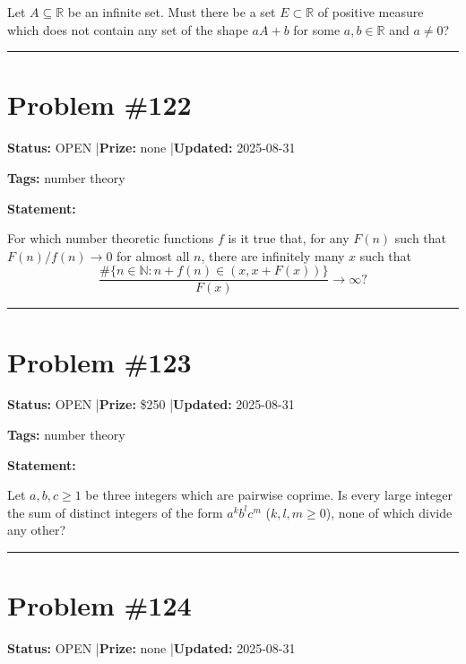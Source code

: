 \documentclass{article}
\begin{document}
Let $A\subseteq\mathbb{R}$ be an infinite set. Must there be a set $E\subset \mathbb{R}$ of positive measure which does not contain any set of the shape $aA+b$ for some $a,b\in\mathbb{R}$ and $a\neq 0$?

\noindent\rule{\linewidth}{0.4pt}


\section{Problem \#122}
\label{prob:122}

\noindent\textbf{Status:} OPEN \quad|\quad \textbf{Prize:} none \quad|\quad \textbf{Updated:} 2025-08-31

\noindent\textbf{Tags:} number theory

\medskip

\noindent\textbf{Statement:}

For which number theoretic functions $f$ is it true that, for any $F(n)$ such that $F(n)/f(n)\to 0$ for almost all $n$, there are infinitely many $x$ such that\[\frac{\#\{ n\in \mathbb{N} : n+f(n)\in (x,x+F(x))\}}{F(x)}\to \infty?\]

\noindent\rule{\linewidth}{0.4pt}


\section{Problem \#123}
\label{prob:123}

\noindent\textbf{Status:} OPEN \quad|\quad \textbf{Prize:} \$250 \quad|\quad \textbf{Updated:} 2025-08-31

\noindent\textbf{Tags:} number theory

\medskip

\noindent\textbf{Statement:}

Let $a,b,c\geq 1$ be three integers which are pairwise coprime. Is every large integer the sum of distinct integers of the form $a^kb^lc^m$ ($k,l,m\geq 0$), none of which divide any other?

\noindent\rule{\linewidth}{0.4pt}


\section{Problem \#124}
\label{prob:124}

\noindent\textbf{Status:} OPEN \quad|\quad \textbf{Prize:} none \quad|\quad \textbf{Updated:} 2025-08-31
\end{document}
